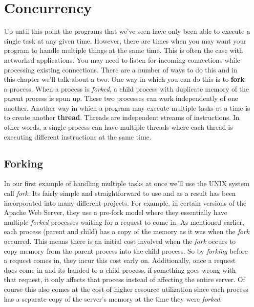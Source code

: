 \documentclass[../main.tex]{subfiles}
\begin{document}
	\chapter{Concurrency}\label{ch:7}
	Up until this point the programs that we've seen have only been able to execute a single task at any given time.  However, there are times when you may want your program to handle multiple things at the same time.  This is often the case with networked applications.  You may need to listen for incoming connections while processing existing connections.  There are a number of ways to do this and in this chapter we'll talk about a two.  
	One way in which you can do this is to \textbf{fork} a process.  When a process is \textit{forked}, a child process with duplicate memory of the parent process is spun up.  These two processes can work independently of one another.  Another way in which a program may execute multiple tasks at a time is to create another \textbf{thread}.  Threads are independent streams of instructions.  In other words, a single process can have multiple threads where each thread is executing different instructions at the same time.
	
	\section{Forking}\label{sec:fork}
	In our first example of handling multiple tasks at once we'll use the UNIX system call \textit{fork}.  Its fairly simple and straightforward to use and as a result has been incorporated into many different projects.  For example, in certain versions of the Apache Web Server, they use a pre-fork model where they essentially have multiple \textit{forked} processes waiting for a request to come in.  As mentioned earlier, each process (parent and child) has a copy of the memory as it was when the \textit{fork} occurred.  This means there is an initial cost involved when the \textit{fork} occurs to copy memory from the parent process into the child process.  So by \textit{forking} before a request comes in, they incur this cost early on.  Additionally, once a request does come in and its handed to a child process, if something goes wrong with that request, it only affects that process instead of affecting the entire server.  Of course this also comes at the cost of higher resource utilization since each process has a separate copy of the server's memory at the time they were \textit{forked}.
	
\end{document}
